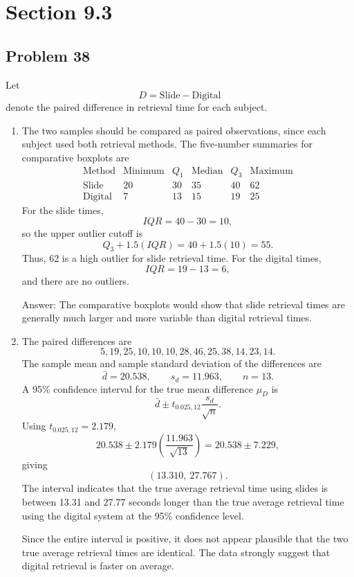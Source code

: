 \documentclass[11pt]{article}
\begin{document}
\section*{Section 9.3}

\subsection*{Problem 38}

Let
\[
D=\text{Slide}-\text{Digital}
\]
denote the paired difference in retrieval time for each subject.

\begin{enumerate}
\item[(a)] The two samples should be compared as paired observations, since each subject used both retrieval methods. The five-number summaries for comparative boxplots are
\[
\begin{array}{c|ccccc}
\text{Method} & \text{Minimum} & Q_1 & \text{Median} & Q_3 & \text{Maximum}\\
\hline
\text{Slide} & 20 & 30 & 35 & 40 & 62\\
\text{Digital} & 7 & 13 & 15 & 19 & 25
\end{array}
\]
For the slide times,
\[
IQR=40-30=10,
\]
so the upper outlier cutoff is
\[
Q_3+1.5(IQR)=40+1.5(10)=55.
\]
Thus, 62 is a high outlier for slide retrieval time. For the digital times,
\[
IQR=19-13=6,
\]
and there are no outliers.

\begin{center}
\end{center}

Answer: The comparative boxplots would show that slide retrieval times are generally much larger and more variable than digital retrieval times.

\item[(b)] The paired differences are
\[
5,
19,
25,
10,
10,
10,
28,
46,
25,
38,
14,
23,
14.
\]
The sample mean and sample standard deviation of the differences are
\[
\bar{d}=20.538,
\qquad s_d=11.963,
\qquad n=13.
\]
A 95\% confidence interval for the true mean difference $\mu_D$ is
\[
\bar{d}\pm t_{0.025,12}\frac{s_d}{\sqrt{n}}.
\]
Using $t_{0.025,12}=2.179$,
\[
20.538\pm 2.179\left(\frac{11.963}{\sqrt{13}}\right)
=20.538\pm 7.229,
\]
giving
\[
(13.310,\ 27.767).
\]
The interval indicates that the true average retrieval time using slides is between 13.31 and 27.77 seconds longer than the true average retrieval time using the digital system at the 95\% confidence level.

Since the entire interval is positive, it does not appear plausible that the two true average retrieval times are identical. The data strongly suggest that digital retrieval is faster on average.
\end{enumerate}
\end{document}
